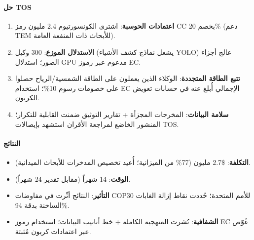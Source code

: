 \documentclass[11pt]{article}
\begin{document}
\paragraph{حل TOS}
\begin{enumerate}[noitemsep]
  \item \textbf{اعتمادات الحوسبة}: اشترى الكونسورتيوم 2.4 مليون رمز CC بخصم 20\% (دعم TEM للأبحاث ذات المنفعة العامة).
  \item \textbf{الاستدلال الموزع}: 300 وكيل (يشغل نماذج كشف الأشياء YOLO) عالج أجزاء الصور؛ استدلال GPU مدعوم عبر رموز EC.
  \item \textbf{تتبع الطاقة المتجددة}: الوكلاء الذين يعملون على الطاقة الشمسية/الرياح حصلوا على خصومات رسوم 10\%؛ استخدام EC الإجمالي أُبلغ عنه في حسابات تعويض الكربون.
  \item \textbf{سلامة البيانات}: المخرجات المجزأة + تقارير التوثيق ضمنت القابلية للتكرار؛ المنشور الخاضع لمراجعة الأقران استشهد بإيصالات TOS.
\end{enumerate}

\paragraph{النتائج}
\begin{itemize}[noitemsep]
  \item \textbf{التكلفة}: \$2.7 مليون (77\% من الميزانية؛ أُعيد تخصيص المدخرات للأبحاث الميدانية).
  \item \textbf{الوقت}: 14 شهراً (مقابل تقدير 24 شهراً).
  \item \textbf{التأثير}: النتائج أثّرت في مفاوضات COP30 للأمم المتحدة؛ حُددت نقاط إزالة الغابات الساخنة بدقة 94\%.
  \item \textbf{الشفافية}: نُشرت المنهجية الكاملة + خط أنابيب البيانات؛ استخدام رموز EC عُوّض عبر اعتمادات كربون مُثبتة.
\end{itemize}
\end{document}
